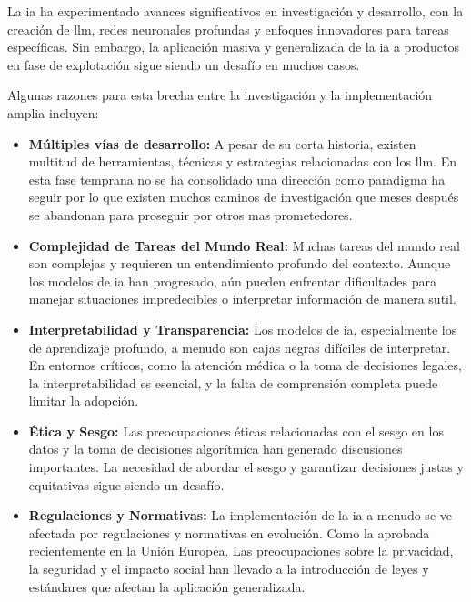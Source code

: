 La \acrshort{ia} ha experimentado avances significativos en investigación y desarrollo, con la creación de \acrshort{llm}, redes neuronales profundas y enfoques innovadores para tareas específicas. Sin embargo, la aplicación masiva y generalizada de la \acrshort{ia} a productos en fase de explotación sigue siendo un desafío en muchos casos.

Algunas razones para esta brecha entre la investigación y la implementación amplia incluyen:

\begin{itemize}

\item \textbf{Múltiples vías de desarrollo:} A pesar de su corta historia, existen multitud de herramientas, técnicas y estrategias relacionadas con los \acrshort{llm}. En esta fase temprana no se ha consolidado una dirección como paradigma ha seguir por lo que existen muchos caminos de investigación que meses después se abandonan para proseguir por otros mas prometedores.

\item \textbf{Complejidad de Tareas del Mundo Real:} Muchas tareas del mundo real son complejas y requieren un entendimiento profundo del contexto. Aunque los modelos de \acrshort{ia} han progresado, aún pueden enfrentar dificultades para manejar situaciones impredecibles o interpretar información de manera sutil.

\item \textbf{Interpretabilidad y Transparencia:} Los modelos de \acrshort{ia}, especialmente los de aprendizaje profundo, a menudo son cajas negras difíciles de interpretar. En entornos críticos, como la atención médica o la toma de decisiones legales, la interpretabilidad es esencial, y la falta de comprensión completa puede limitar la adopción.

\item \textbf{Ética y Sesgo:} Las preocupaciones éticas relacionadas con el sesgo en los datos y la toma de decisiones algorítmica han generado discusiones importantes. La necesidad de abordar el sesgo y garantizar decisiones justas y equitativas sigue siendo un desafío.

\item \textbf{Regulaciones y Normativas:} La implementación de la \acrshort{ia} a menudo se ve afectada por regulaciones y normativas en evolución. Como la aprobada recientemente en la Unión Europea. Las preocupaciones sobre la privacidad, la seguridad y el impacto social han llevado a la introducción de leyes y estándares que afectan la aplicación generalizada.

\end{itemize}

